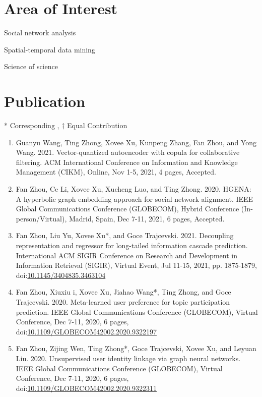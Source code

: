 \section*{Area of Interest}
\indent

Social network analysis

Spatial-temporal data mining

Science of science

\section*{Publication}
\indent

* Corresponding
, $\dagger$ Equal Contribution


\begin{enumerate}[resume]
    \item Guanyu Wang, Ting Zhong, Xovee Xu, Kunpeng Zhang, Fan Zhou, and Yong Wang. 2021. Vector-quantized autoencoder with copula for collaborative filtering. ACM International Conference on Information and Knowledge Management (CIKM), Online, Nov 1-5, 2021, 4 pages, Accepted. 
    \item Fan Zhou, Ce Li, Xovee Xu, Xucheng Luo, and Ting Zhong. 2020. HGENA: A hyperbolic graph embedding approach for social network alignment. IEEE Global Communications Conference (GLOBECOM), Hybrid Conference (In-person/Virtual), Madrid, Spain, Dec 7-11, 2021, 6 pages, Accepted. 
    \item Fan Zhou, Liu Yu, Xovee Xu*, and Goce Trajcevski. 2021. Decoupling representation and regressor for long-tailed information cascade prediction. International ACM SIGIR Conference on Research and Development in Information Retrieval (SIGIR), Virtual Event, Jul 11-15, 2021, pp. 1875-1879, doi:\href{https://doi.org/10.1145/3404835.3463104}{10.1145/3404835.3463104}
    \item Fan Zhou, Xiuxiu \swashQ i, Xovee Xu, Jiahao Wang*, Ting Zhong, and Goce Trajcevski. 2020. Meta-learned user preference for topic participation prediction. IEEE Global Communications Conference (GLOBECOM), Virtual Conference, Dec 7-11, 2020, 6 pages, doi:\href{https://doi.org/10.1109/GLOBECOM42002.2020.9322197}{10.1109/GLOBECOM42002.2020.9322197}
    \item Fan Zhou, Zijing Wen, Ting Zhong*, Goce Trajcevski, Xovee Xu, and Leyuan Liu. 2020. Unsupervised user identity linkage via graph neural networks. IEEE Global Communications Conference (GLOBECOM), Virtual Conference, Dec 7-11, 2020, 6 pages, doi:\href{https://doi.org/10.1109/GLOBECOM42002.2020.9322311}{10.1109/GLOBECOM42002.2020.9322311}

\end{enumerate}
